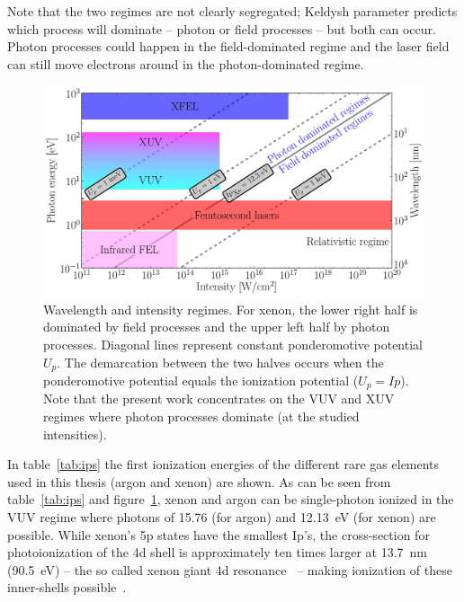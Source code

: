 Note that the two regimes are not clearly segregated; Keldysh parameter
predicts which process will dominate -- photon or field processes --
but both can occur. Photon processes could happen in the field-dominated
regime and the laser field can still move electrons around in the photon-dominated regime.

\begin{figure}
\centering
\includegraphics[width=\figurewidth]{figures/regimes}
\caption{Wavelength and intensity regimes. For xenon, the lower right half is dominated
         by field processes and the upper left half by photon processes. Diagonal
         lines represent constant ponderomotive potential $U_p$. The
         demarcation between the two halves occurs when the ponderomotive
         potential equals the ionization potential ($U_p = Ip$).
         Note that the present work concentrates on the VUV and XUV regimes
         where photon processes dominate (at the studied intensities).}
\label{fig:regimes}
\end{figure}

In table~\ref{tab:ips} the first ionization energies of the different
rare gas elements used in this thesis (argon and xenon) are shown. As can be
seen from table~\ref{tab:ips} and figure~\ref{fig:regimes}, xenon and argon can be
single-photon ionized in the VUV regime where photons of 15.76 (for argon)
and 12.13~eV (for xenon) are possible. While xenon's 5p states have the smallest
Ip's, the cross-section for photoionization of the 4d shell is approximately ten
times larger at 13.7~nm (90.5~eV) -- the so called xenon giant 4d
resonance~\cite{Becker1986} -- making ionization of these inner-shells
possible~\cite{Thomas2009,Ackad2013}.

